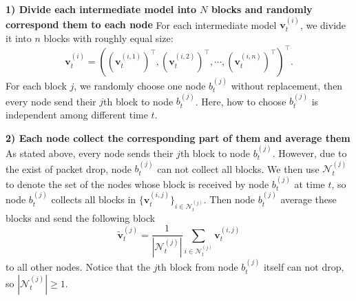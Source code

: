 \documentclass{article}
\renewcommand{\paragraph}[1]{\noindent\textbf{#1}}
\def\rc{\color{red}}
\begin{document}
\paragraph{1) Divide each intermediate model into $N$ blocks and randomly correspond them to each node} For each intermediate model $\bm{v}_t^{(i)}$, we divide it into $n$ blocks {\rc with roughly equal size}:
\begin{equation}\label{eq: dividev}
\bm{v}_t^{(i)} = \left(\left(\bm{v}_t^{(i,1)}\right)^{\top}, \left(\bm{v}_t^{(i,2)}\right)^{\top}, \cdots, \left(\bm{v}_t^{(i,n)}\right)^{\top}\right)^{\top}.
\end{equation}
For each block $j$, we randomly choose one node $b_t^{(j)}$ without replacement, then every node send their $j$th block to node $b_t^{(j)}$. Here, how to choose $b_t^{(j)}$ is independent among different time $t$. 

\paragraph{2) Each node collect the corresponding part of them and average them} As stated above, every node sends their $j$th block to node $b_t^{(j)}$. However, due to the exist of packet drop, node $b_t^{(j)}$ can not collect all blocks. We then use $\mathcal{N}_t^{(j)}$ to denote the set of the nodes whose block is received by node $b_t^{(j)}$ at time $t$, so node $b_t^{(j)}$ collects all blocks in $\big\{\bm{v}_t^{(i,j)}\big\}_{i\in \mathcal{N}_t^{(j)}}$. Then node $b_t^{(j)}$ average these blocks and send the following block
\begin{equation*}
	\tilde{\bm{v}}_t^{(j)} = \frac{1}{|\mathcal{N}_t^{(j)}|}\sum\limits_{i\in \mathcal{N}_t^{(j)}} \bm{v}_t^{(i,j)}
\end{equation*}
to all other nodes. Notice that the $j$th block from node $b_t^{(j)}$ itself can not drop, so $|\mathcal{N}_t^{(j)}|\ge 1$.
\end{document}
